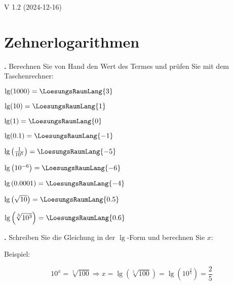 
\renewcommand{\bbwAufgabenBlockID}{A2Log}

\renewcommand{\metaHeaderLine}{Logarithmen}
\renewcommand{\arbeitsblattTitel}{Algebra: Logarithmen}


\arbeitsblattHeader{}

\begin{center}V 1.2 (2024-12-16) \end{center}
\section{Zehnerlogarithmen}

\textbf{\bbwAufgabenNummer{}.}
Berechnen Sie von Hand den Wert des Termes und prüfen Sie mit dem Taschenrechner:

\begin{bbwAufgabenBlock}
\item $\lg(1000) = \LoesungsRaumLang{3}$
\item $\lg(10) = \LoesungsRaumLang{1}$
\item $\lg(1) = \LoesungsRaumLang{0}$
\item $\lg(0.1) = \LoesungsRaumLang{-1}$
\item $\lg\left(\frac1{10^5}\right) = \LoesungsRaumLang{-5}$
\item $\lg\left(10^{-6}\right) = \LoesungsRaumLang{-6}$
\item $\lg\left(0.0001\right) = \LoesungsRaumLang{-4}$
\item $\lg\left(\sqrt{10}\right) = \LoesungsRaumLang{0.5}$
\item $\lg\left(\sqrt[5]{10^3}\right) = \LoesungsRaumLang{0.6}$
\end{bbwAufgabenBlock}

\newpage


\textbf{\bbwAufgabenNummer{}.}
Schreiben Sie die Gleichung in der $\lg$-Form und berechnen Sie $x$:

Beispiel:

$$10^x=\sqrt[5]{100} \Longrightarrow   x=\lg\left(\sqrt[5]{100}\right)
= \lg\left(10^{\frac25}\right) = \frac25$$


